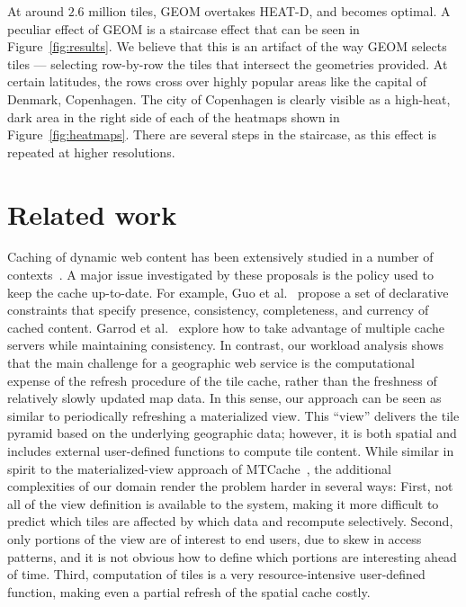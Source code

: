 \documentclass[11pt, oneside]{report}
\begin{document}
{At around $2.6$ million tiles, GEOM overtakes HEAT-D, and becomes optimal. A peculiar effect of GEOM is a staircase effect that can be seen in Figure~\ref{fig:results}. We believe that this is an artifact of the way GEOM selects tiles --- selecting row-by-row the tiles that intersect the geometries provided. At certain latitudes, the rows cross over highly popular areas like the capital of Denmark, Copenhagen. The city of Copenhagen is clearly visible as a high-heat, dark area in the right side of each of the heatmaps shown in Figure~\ref{fig:heatmaps}. There are several steps in the staircase, as this effect is repeated at higher resolutions.

\section{Related work}
\label{sec:tileheat:related:work}

Caching of dynamic web content has been extensively studied in a number of contexts~\cite{datta2001acceleration,garrod2008ferdinand,guo2005goodenough,larson2004mtcache,luo2002dbcache,mohan2001webcaching}. A major issue investigated by these proposals is the policy used to keep the cache up-to-date. 
For example, Guo et al.~\cite{guo2005goodenough} propose a set of declarative constraints that specify presence,  consistency, completeness, and currency of cached content. 
Garrod et al.~\cite{garrod2008ferdinand} explore how to take advantage of multiple cache servers while maintaining consistency. In contrast, our workload analysis shows that the main challenge for a geographic web service is the computational expense of the refresh procedure of the tile cache, rather than the freshness of relatively slowly updated map data. In this sense, our approach can be seen as similar to periodically refreshing a materialized view. This  ``view'' delivers the tile pyramid based on the underlying geographic data; however, it is both spatial and includes external user-defined functions to compute tile content. While similar in spirit to the materialized-view approach of MTCache~\cite{larson2004mtcache}, the additional complexities of our domain render the problem harder in several ways: First, not all of the view definition is available to the system, making it more difficult to predict which tiles are affected by which data and recompute selectively. Second, only portions of the view are of interest to end users, due to skew in access patterns, and it is not obvious how to define which portions are interesting ahead of time. Third, computation of tiles is a very resource-intensive user-defined function, making even a partial refresh of the spatial cache costly.  
 
}
\end{document}
